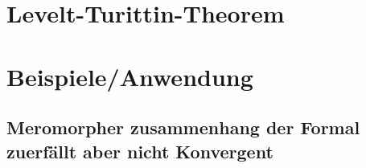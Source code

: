 \documentclass[ngerman
  ,numbers=noenddot %
  ,headsepline
  ,parskip=half*
  ,openany
  ,DIV=12
]{scrbook}
\numberwithin{equation}{chapter}
\numberwithin{figure}{chapter}
\theoremstyle{plain}%
\theoremstyle{definition}
\theoremstyle{remark}
\begin{document}

\frontmatter



\tableofcontents{}



\mainmatter






\chapter{Levelt-Turittin-Theorem}


\chapter{Beispiele/Anwendung}
\section{Meromorpher zusammenhang der Formal zuerfällt aber nicht Konvergent}
\begin{comment}
  Quellen??
\end{comment}

\appendix
{}



\nocite{*}
%


\end{document}
